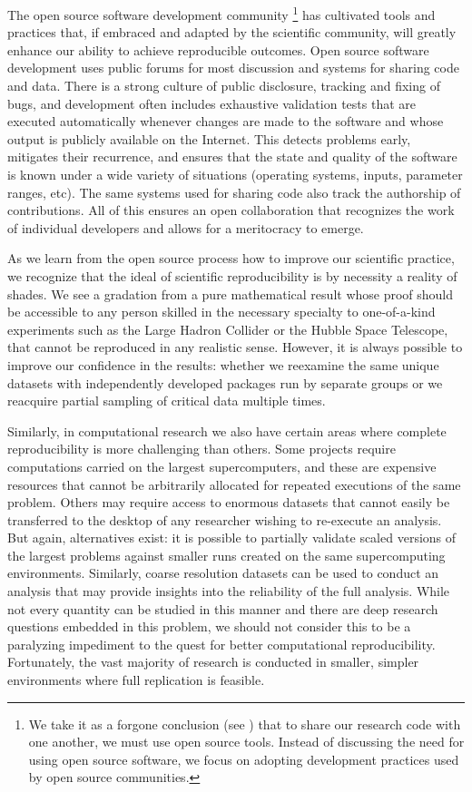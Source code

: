 \documentclass[11pt,oneside,english]{article}
\begin{document}
The open source software development community%
\footnote{We take
  it as a forgone conclusion (see \cite{joyner2007open}) that to share our research
  code with one another, we must use
  open source tools.  Instead of discussing the need for using open source
  software, we focus on adopting development practices used by open source
  communities.}
has cultivated tools and practices that, if embraced and adapted by the
scientific community, will greatly enhance our ability to achieve reproducible
outcomes.  Open source software development uses public forums for most
discussion and systems for sharing code and data. There is a strong culture of
public disclosure, tracking and fixing of bugs, and development often includes
exhaustive validation tests that are executed automatically whenever changes
are made to the software and whose output is publicly available on the
Internet. This detects problems early, mitigates their recurrence, and ensures
that the state and quality of the software is known under a wide variety of
situations (operating systems, inputs, parameter ranges, etc).  The same
systems used for sharing code also track the authorship of contributions. All
of this ensures an open collaboration that recognizes the work of individual
developers and allows for a meritocracy to emerge.

As we learn from the open source process how to improve our scientific
practice, we recognize that the ideal of scientific reproducibility is by
necessity a reality of shades. We see a gradation from a pure mathematical
result whose proof should be accessible to any person skilled in the necessary
specialty to one-of-a-kind experiments such as the Large Hadron Collider or the
Hubble Space Telescope, that cannot be reproduced in any realistic sense.
However, it is always possible to improve our confidence in the results:
whether we reexamine the same unique datasets with independently developed
packages run by separate groups or we reacquire partial sampling of critical
data multiple times.

Similarly, in computational research we also have certain areas where complete
reproducibility is more challenging than others. Some projects require
computations carried on the largest supercomputers, and these are expensive
resources that cannot be arbitrarily allocated for repeated executions of the
same problem. Others may require access to enormous datasets that cannot
easily be transferred to the desktop of any researcher wishing to re-execute an
analysis.  But again, alternatives exist: it is possible to partially validate
scaled versions of the largest problems against smaller runs created on the
same supercomputing environments.  Similarly, coarse resolution datasets can be
used to conduct an analysis that may provide insights into the reliability of
the full analysis.  While not every quantity can be studied in this manner and
there are deep research questions embedded in this problem, we should not
consider this to be a paralyzing impediment to the quest for better
computational reproducibility.  Fortunately, the vast majority of research is
conducted in smaller, simpler environments where full replication is feasible.
\end{document}
